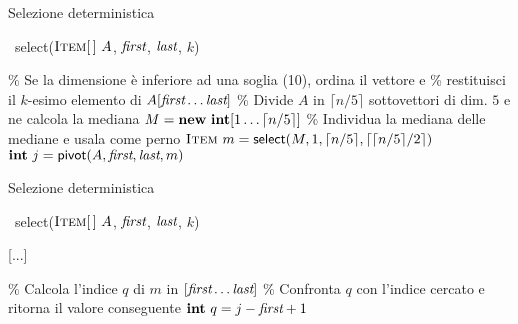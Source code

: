 \begin{frame}{Selezione deterministica}

\vspace{-12pt}
\small
\begin{Procedure}
\caption[A]{\Item\ \textsf{select}($\textsc{Item}[\,]\ A$, \INTEGER $\textit{first}$, \INTEGER $\textit{last}$, \INTEGER $k$)}
\% Se la dimensione è inferiore ad una soglia (10), ordina il vettore e\;
\% restituisci il $k$-esimo  elemento di $A[\textit{first} \ldots \textit{last}]$\;
\BlankLine
\% Divide $A$ in $\lceil n/5 \rceil$ sottovettori di dim. $5$ e ne calcola la mediana\;
$M = \NEW\ \INTEGER[1 \ldots \lceil n/5 \rceil]$\;
\BlankLine
\% Individua la mediana delle mediane e usala come perno\;
$\textsc{Item}\ m = \textsf{select}(M, 1, \lceil n/5 \rceil, \lceil \lceil n/5 \rceil/2 \rceil)$\;
$\INTEGER\ j = \textsf{pivot}(A, \Primo, \Ultimo, m)$\;
[...]\;
\end{Procedure}

\end{frame}

\begin{frame}{Selezione deterministica}

\vspace{-12pt}
\small
\begin{Procedure}
\caption[A]{\Item\ \textsf{select}($\textsc{Item}[\,]\ A$, \INTEGER $\textit{first}$, \INTEGER $\textit{last}$, \INTEGER $k$)}
[...]\;

\BlankLine
\% Calcola l'indice $q$ di $m$ in $[\textit{first} \ldots \textit{last}]$\;
\% Confronta $q$ con l'indice cercato e ritorna il valore conseguente\;
$\INTEGER\ q = j-\Primo+1$\;
\end{Procedure}

\end{frame}


